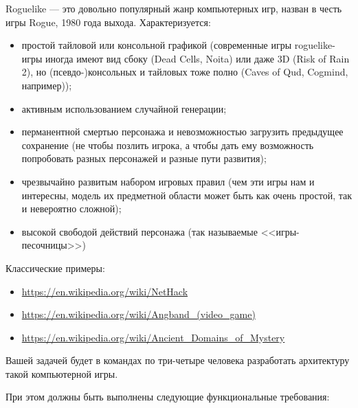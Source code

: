\documentclass[a5paper]{homework}
\begin{document}

Roguelike --- это довольно популярный жанр компьютерных игр, назван в честь игры Rogue, 1980 года выхода. Характеризуется:

\begin{itemize}
    \item простой тайловой или консольной графикой (современные игры roguelike-игры иногда имеют вид сбоку (Dead Cells, Noita) или даже 3D (Risk of Rain 2), но (псевдо-)консольных и тайловых тоже полно (Caves of Qud, Cogmind, например));
    \item активным использованием случайной генерации;
    \item перманентной смертью персонажа и невозможностью загрузить предыдущее сохранение (не чтобы позлить игрока, а чтобы дать ему возможность попробовать разных персонажей и разные пути развития);
    \item чрезвычайно развитым набором игровых правил (чем эти игры нам и интересны, модель их предметной области может быть как очень простой, так и невероятно сложной);
    \item высокой свободой действий персонажа (так называемые <<игры-песочницы>>)
\end{itemize}

Классические примеры:
\begin{itemize}
    \item \url{https://en.wikipedia.org/wiki/NetHack}
    \item \url{https://en.wikipedia.org/wiki/Angband_(video_game)}
    \item \url{https://en.wikipedia.org/wiki/Ancient_Domains_of_Mystery}
\end{itemize}

Вашей задачей будет в командах по три-четыре человека разработать архитектуру такой компьютерной игры.

При этом должны быть выполнены следующие функциональные требования:
\end{document}

